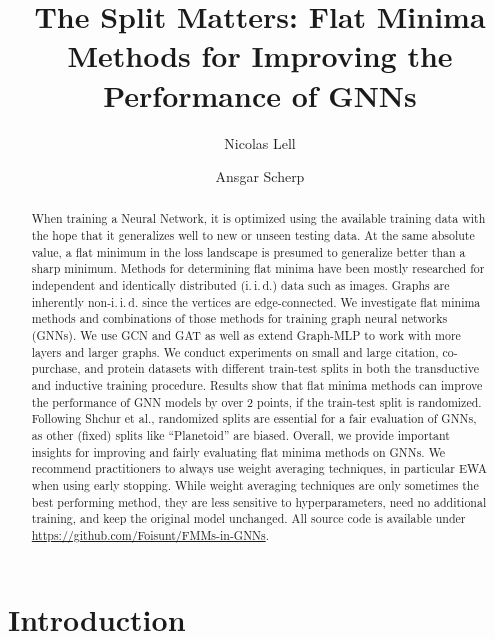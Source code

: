 \documentclass[runningheads]{llncs}
\begin{document}
\title{The Split Matters: Flat Minima Methods for Improving the Performance of GNNs}
\author{Nicolas Lell
\and
Ansgar Scherp}
\maketitle              


\begin{abstract}
When training a Neural Network, it is optimized using the available training data with the hope that it generalizes well to new or unseen testing data.
At the same absolute value, a flat minimum in the loss landscape is presumed to generalize better than a sharp minimum.
Methods for determining flat minima have been mostly researched for independent and identically distributed (i.\,i.\,d.) data such as images. 
Graphs are inherently non-i.\,i.\,d. since the vertices are edge-connected. 
We investigate flat minima methods and combinations of those methods for training graph neural networks (GNNs). 
We use GCN and GAT as well as extend Graph-MLP to work with more layers and larger graphs. 
We conduct experiments on small and large citation, co-purchase, and protein datasets with different train-test splits in both the transductive and inductive training procedure.
Results show that flat minima methods can improve the performance of GNN models by over 2 points, if the train-test split is randomized. 
Following Shchur et al., randomized splits are essential for a fair evaluation of GNNs, as other (fixed) splits like ``Planetoid'' are biased. Overall, we provide important insights for improving and fairly evaluating flat minima methods on GNNs.
We recommend practitioners to always use weight averaging techniques, in particular EWA when using early stopping.
While weight averaging techniques are only sometimes the best performing method, they are less sensitive to hyperparameters, need no additional training, and keep the original model unchanged. 
All source code is available under \url{https://github.com/Foisunt/FMMs-in-GNNs}.



\end{abstract}

\section{Introduction}
\end{document}
